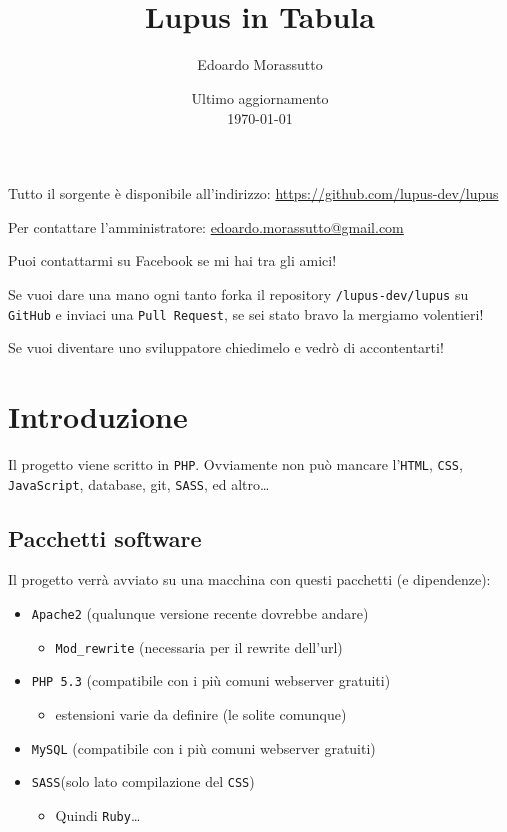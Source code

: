 \documentclass[10pt,a4paper]{article}
\title{
\horrule{0.5pt} \\[0.5cm]
\huge Lupus in Tabula
\horrule{0.5pt}
}
\author{
{\Large Edoardo Morassutto}
}
\date{
{\small Ultimo aggiornamento} \\
\today
}
\newcommand{\mail}[1]{\href{mailto:#1}{#1}}
\newcommand{\lang}[1]{\texttt{#1}}
\newcommand{\PHP}{\lang{PHP}}
\newcommand{\SASS}{\lang{SASS}}
\newcommand{\CSS}{\lang{CSS}}
\newcommand{\pack}[1]{\texttt{#1}}
\begin{document}
\maketitle

Tutto il sorgente è disponibile all'indirizzo: \url{https://github.com/lupus-dev/lupus}

Per contattare l'amministratore: \mail{edoardo.morassutto@gmail.com}

Puoi contattarmi su Facebook se mi hai tra gli amici!

Se vuoi dare una mano ogni tanto forka il repository \texttt{/lupus-dev/lupus} su \texttt{GitHub} e inviaci una \texttt{Pull Request}, se sei stato bravo la mergiamo volentieri!

Se vuoi diventare uno sviluppatore chiedimelo e vedrò di accontentarti!

\section{Introduzione}
Il progetto viene scritto in \PHP. Ovviamente non può mancare l'\lang{HTML}, \lang{CSS}, \lang{JavaScript}, database, git, \lang{SASS}, ed altro\dots

\subsection{Pacchetti software}
Il progetto verrà avviato su una macchina con questi pacchetti (e dipendenze):
\begin{itemize}
\item \pack{Apache2} (qualunque versione recente dovrebbe andare)
	\begin{itemize}
	\item \pack{Mod\_rewrite} (necessaria per il rewrite dell'url)
	\end{itemize}
\item \pack{PHP 5.3} (compatibile con i più comuni webserver gratuiti)
	\begin{itemize}
	\item estensioni varie da definire (le solite comunque)
	\end{itemize}
\item \pack{MySQL} (compatibile con i più comuni webserver gratuiti)
\item \SASS (solo lato compilazione del \CSS)
	\begin{itemize}	
	\item Quindi \pack{Ruby}\dots
	\end{itemize}
\end{itemize}
\end{document}
